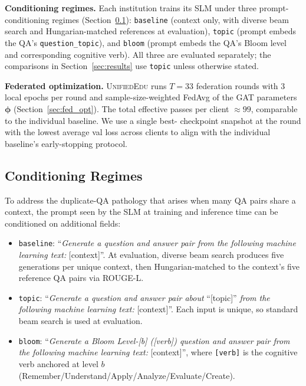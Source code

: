 \documentclass[11pt]{article}
\theoremstyle{plain}
\theoremstyle{definition}
\theoremstyle{remark}
\newcommand{\UniEdu}{\textsc{UnifiedEdu}}
\begin{document}
\textbf{Conditioning regimes.} Each institution
trains its SLM under three prompt-conditioning
regimes (Section~\ref{sec:conditioning}): \texttt{baseline}
(context only, with diverse beam search and
Hungarian-matched references at evaluation),
\texttt{topic} (prompt embeds the QA's
\texttt{question\_topic}), and \texttt{bloom} (prompt
embeds the QA's Bloom level and corresponding
cognitive verb). All three are evaluated separately;
the comparisons in Section~\ref{sec:results} use
\texttt{topic} unless otherwise stated.

\textbf{Federated optimization.} \UniEdu{} runs $T=33$
federation rounds with $3$ local epochs per round and
sample-size-weighted FedAvg of the GAT parameters
$\boldsymbol{\phi}$ (Section~\ref{sec:fed_opt}). The total
effective passes per client $\approx 99$, comparable
to the individual baseline. We use a single best-
checkpoint snapshot at the round with the lowest
average val loss across clients to align with the
individual baseline's early-stopping protocol.

\subsection{Conditioning Regimes}
\label{sec:conditioning}

To address the duplicate-QA pathology that arises
when many QA pairs share a context, the prompt seen
by the SLM at training and inference time can be
conditioned on additional fields:
\begin{itemize}[leftmargin=1.5em, itemsep=2pt]
  \item \texttt{baseline}: ``\textit{Generate a
  question and answer pair from the following machine
  learning text:} {[}context{]}''. At evaluation,
  diverse beam search produces five generations per
  unique context, then Hungarian-matched to the
  context's five reference QA pairs via ROUGE-L.
  \item \texttt{topic}: ``\textit{Generate a question
  and answer pair about }``{[}topic{]}''\textit{
  from the following machine learning text:}
  {[}context{]}''. Each input is unique, so standard
  beam search is used at evaluation.
  \item \texttt{bloom}: ``\textit{Generate a Bloom
  Level-{[}b{]} ({[}verb{]}) question and answer pair
  from the following machine learning text:}
  {[}context{]}'', where \texttt{[verb]} is the
  cognitive verb anchored at level $b$
  (Remember/Understand/Apply/Analyze/Evaluate/Create).
\end{itemize}
\end{document}
